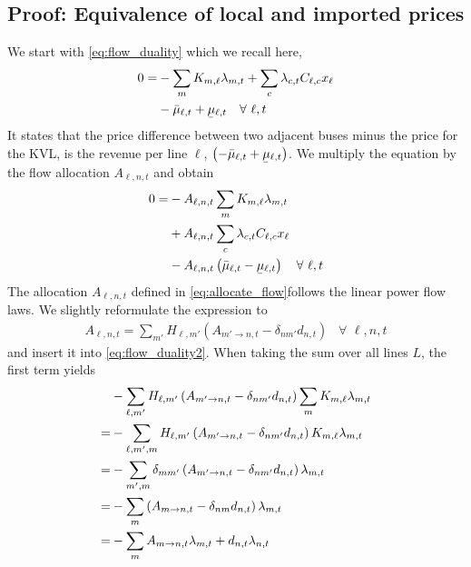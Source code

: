 \documentclass[11pt,twocolumn]{article}
\newcommand{\ubar}[1]{\underaccent{\bar}{#1}}
\newcommand{\Forall}[1]{\hspace{10pt} \forall \,\, #1 }
\newcommand{\mulowerflow}{\ubar{\mu}_{\ell,t}}
\newcommand{\muupperflow}{\bar{\mu}_{\ell,t}}
\newcommand{\lmp}[1][n]{\lambda_{#1,t}}
\newcommand{\demand}[1][n]{d_{#1,t}}
\newcommand{\incidence}[1][n]{K_{#1,\ell}}
\newcommand{\ptdf}[1][n]{H_{\ell,#1}}
\newcommand{\cycle}{C_{\ell,c}}
\newcommand{\reactance}{x_\ell}
\newcommand{\cycleprice}{\lambda_{c,t}}
\newcommand{\allocatepeer}[1][m \rightarrow n]{A_{#1,t}}
\newcommand{\allocateflow}[1][n]{A_{\ell,#1,t}}
\begin{document}
\subsection{Proof: Equivalence of local and imported prices}
\label{sec:proof_equivalence}

We start with \cref{eq:flow_duality} which we recall here, 
\begin{align}
    \notag
    0 = &- \sum_m \incidence[m] \lmp[m]  + \sum_c  \cycleprice \cycle \reactance  \\
    &- \muupperflow + \mulowerflow \Forall{\ell,t} 
\end{align}
It states that the price difference between two adjacent buses minus the price for the KVL, is the revenue per line $\ell$, $\left(- \muupperflow + \mulowerflow\right)$. We multiply the equation by the flow allocation $\allocateflow$ and obtain 
\begin{align}
    \notag
    0 =& - \allocateflow \sum_m \incidence[m] \lmp[m]  \\
    \notag
    &+ \allocateflow \sum_c  \cycleprice \cycle \reactance  \\
    &- \allocateflow \left(\muupperflow - \mulowerflow\right) \Forall{\ell,t} 
    \label{eq:flow_duality2}
\end{align}  
The allocation $\allocateflow$ defined in \cref{eq:allocate_flow}follows the linear power flow laws. We slightly reformulate the expression to
\begin{align}
    \allocateflow = \sum_{m'} \ptdf[m'] \left( \allocatepeer[m' \rightarrow n]  - \delta_{n m'} \demand \right) \Forall{\ell, n, t}
    \label{eq:allocate_flow2}
\end{align}
and insert it into \cref{eq:flow_duality2}. When taking the sum over all lines $L$, the first term yields  
\begin{align}
    \notag
    &- \sum_{\ell, m'} \ptdf[m'] \left( \allocatepeer[m' \rightarrow n]  - \delta_{n m'} \demand \right) \sum_m \incidence[m] \lmp[m] \\
    \notag
    =& - \sum_{\ell, m', m} \ptdf[m'] \left( \allocatepeer[m' \rightarrow n]  - \delta_{n m'} \demand \right) \incidence[m] \lmp[m] \\
    \notag
    =& - \sum_{m', m} \delta_{m m'} \left( \allocatepeer[m' \rightarrow n]  - \delta_{n m'} \demand \right) \lmp[m] \\
    \notag
    =& - \sum_{m} \left( \allocatepeer - \delta_{n m} \demand \right) \lmp[m] \\
    =& - \sum_{m} \allocatepeer \lmp[m] + \demand \lmp 
\end{align}
\end{document}
